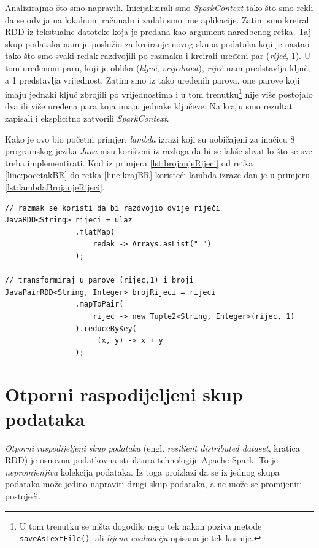 \documentclass[times, utf8, zavrsni, numeric]{fer}
\begin{document}
\vspace{5mm}

Analizirajmo što smo napravili. Inicijalizirali smo \emph{SparkContext} tako što smo rekli da se odvija na lokalnom računalu i zadali smo ime aplikacije. Zatim smo kreirali RDD iz tekstualne datoteke koja je predana kao argument naredbenog retka. Taj skup podataka nam je poslužio za kreiranje novog skupa podataka koji je nastao tako što smo svaki redak razdvojili po razmaku i kreirali uređeni par (\emph{riječ}, 1). U tom uređenom paru, koji je oblika (\emph{ključ}, \emph{vrijednost}), \emph{riječ} nam predstavlja ključ, a 1 predstavlja vrijednost. Zatim smo iz tako uređenih parova, one parove koji imaju jednaki ključ zbrojili po vrijednostima i u tom trenutku\footnote{U tom trenutku se ništa dogodilo nego tek nakon poziva metode \texttt{saveAsTextFile()}, ali \emph{lijena evaluacija}  opisana je tek kasnije.} nije više postojalo dva ili više uređena para koja imaju jednake ključeve. Na kraju smo rezultat zapisali i eksplicitno zatvorili \emph{SparkContext}. 

Kako je ovo bio početni primjer, \emph{lambda} izrazi koji su uobičajeni za inačicu 8 programskog jezika \emph{Java} nisu korišteni iz razloga da bi se lakše shvatilo što se sve treba implementirati. Kod iz primjera \ref{lst:brojanjeRijeci} od retka \ref{line:pocetakBR} do retka \ref{line:krajBR} koristeći lambda izraze dan je u primjeru \ref{lst:lambdaBrojanjeRijeci}.
\vspace{5mm}
\begin{lstlisting}[label={lst:lambdaBrojanjeRijeci}, caption={Brojanje riječi koristeći lambda izraze.}]
// razmak se koristi da bi razdvojio dvije riječi
JavaRDD<String> rijeci = ulaz
				.flatMap(
					redak -> Arrays.asList(" ")
				);

// transformiraj u parove (rijec,1) i broji
JavaPairRDD<String, Integer> brojRijeci = rijeci
				.mapToPair(
				 	rijec -> new Tuple2<String, Integer>(rijec, 1)
				).reduceByKey(
					 (x, y) -> x + y
				);
\end{lstlisting}
\vspace{5mm}


\section{Otporni raspodijeljeni skup podataka}
\emph{Otporni raspodijeljeni skup podataka} (engl. \emph{resilient distributed dataset}, kratica RDD) je osnovna podatkovna struktura tehnologije Apache Spark. To je \emph{nepromjenjiva}  kolekcija podataka. Iz toga proizlazi da se iz jednog skupa podataka može jedino napraviti drugi skup podataka, a ne može se promijeniti postojeći.
\end{document}
